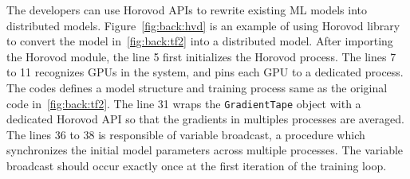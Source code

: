 The developers can use Horovod APIs to rewrite existing ML models into
distributed models.
Figure~\ref{fig:back:hvd} is an example of using Horovod library to convert
the model in~\ref{fig:back:tf2} into a distributed model.
After importing the Horovod module, the line 5 first initializes the
Horovod process. 
The lines 7 to 11 recognizes GPUs in the system, and pins each GPU to
a dedicated process.
The codes defines a model structure and training process same as the original
code in~\ref{fig:back:tf2}.
The line 31 wraps the {\tt GradientTape} object with a dedicated 
Horovod API so that the gradients in multiples processes are averaged.
The lines 36 to 38 is responsible of variable broadcast, a procedure which
synchronizes the initial model parameters across multiple processes.
The variable broadcast should occur exactly once at the first iteration of
the training loop.

